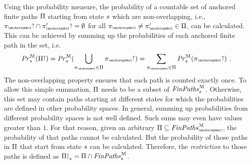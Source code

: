 Using this probability measure, the probability of a countable set of anchored finite paths $\Pi$ starting from state $s$ which are non-overlapping, i.e., $\Cylinder{\ancfinpath} \cap \Cylinder{\ancfinpath'} = \emptyset$ for all $\ancfinpath \neq \ancfinpath' \in \AncFinPathsOfInterest$, can be calculated.
This can be achieved by summing up the probabilities of each anchored finite path in the set, i.e.
\begin{equation*}
	\McProbInState{\state}(\Cylinder{\AncFinPathsOfInterest}) =
	\McProbInState{\state}(\bigdjunion_{\ancfinpath\in\AncFinPathsOfInterest} \Cylinder{\ancfinpath}) =
	\sum_{\ancfinpath \in \AncFinPathsOfInterest} \McProbInState{\state}(\Cylinder{\ancfinpath})
	\ \text{.}
\end{equation*}
The non-overlapping property ensures that each path is counted exactly once.
%
To allow this simple summation, $\Pi$ needs to be a subset of $\mathit{FinPaths}_{s}^{\mathcal{M}}$.
Otherwise, this set may contain paths starting at different states for which the probabilities are defined in other probability spaces.
In general, summing up probabilities from different probability spaces is not well defined.
Such sums may even have values greater than $1$.
%
For that reason, given an arbitrary $\AncFinPathsOfInterest \subseteq \McAncFinPaths$, the probability of that paths cannot be calculated.
But the probability of those paths in $\Pi$ that start from state $s$ can be calculated.
Therefore, the \emph{restriction} to those paths is defined as ${\Pi\mathop{\hspace{-0.2em}\upharpoonright^{}_{s}}} = \Pi \cap \mathit{FinPaths}_{s}^{\mathcal{M}}$.

